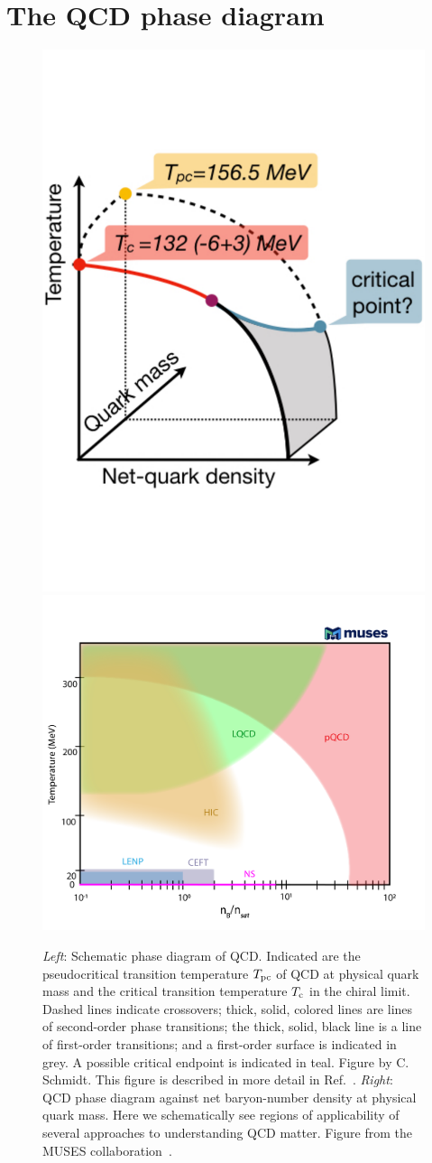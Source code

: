 \section{The QCD phase diagram}

\begin{figure}
\centering
\vspace{-1cm}
\includegraphics[width=0.48\linewidth]{figs/3d_phase_diag_Gauss.003.pdf}
\hspace{-2mm}
\includegraphics[width=0.48\linewidth]{figs/accessibleQCD.png}
\caption{{\it Left}: Schematic phase diagram of QCD. Indicated are the pseudocritical 
transition temperature $T_{\rm pc}$ of QCD at physical quark mass and the critical 
transition temperature $T_{\rm c}$ in the chiral limit. Dashed lines indicate 
crossovers; thick, solid, colored lines are lines of second-order phase 
transitions; the thick, solid, black line is a line of first-order
transitions; and a first-order surface is indicated in grey. 
A possible critical endpoint is indicated in teal. Figure by C. Schmidt.
This figure is described in more detail in Ref.~\cite{karsch_critical_2019}.
{\it Right}: QCD phase diagram against net baryon-number density at
physical quark mass. 
Here we schematically see regions of applicability of several approaches
to understanding QCD matter. Figure from the MUSES 
collaboration~\cite{MUSES:2023hyz}.
}
\label{fig:pdiag}
\end{figure}

